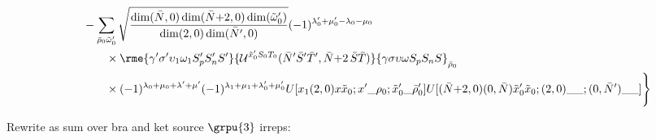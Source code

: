\documentclass[%
  aps,%
  prc,%
  showpacs,%
  superscriptaddress,%
  onecolumn,%
  notitlepage,%
  11pt,%
  floatfix,%
  amsmath,%
  amssymb,%
]{revtex4-2}
\newcommand{\plus}{\text{+}}
\begin{document}
\begin{align*}
  &\qquad-\sum_{\bar{\rho}_0\tilde{\omega}_0'}
  \sqrt{\frac{\dim(\bar{N},0)\dim(\bar{N}\plus2,0)\dim(\tilde{\omega}_0')}{\dim(2,0)\dim(\bar{N}',0)}}
  (-1)^{\lambda_0'+\mu_0'-\lambda_0-\mu_0}
  \\
  & \qquad \qquad \times
  \rme{\gamma'\sigma'\upsilon_1\omega_1S_p'S_n'S'}{\mathcal{U}^{\tilde{x}_0' S_0 T_0}(\bar{N}'\bar{S}'\bar{T}',\bar{N}\plus2\,\bar{S}\bar{T})}{\gamma \sigma \upsilon \omega S_p S_n S}_{\bar{\rho}_0}\\
  &\qquad\qquad\times
      (-1)^{\lambda_0+\mu_0+\lambda'+\mu'}(-1)^{\lambda_1+\mu_1+\lambda_0'+\mu_0'} U[x_1 (2,0) x \tilde{x}_0; x'\_\rho_0;\tilde{x}_0'\_\bar{\rho}_0']
      U[(\bar{N}\plus2,0)(0,\bar{N}) \tilde{x}_0' \tilde{x}_0;(2,0)\_\_;(0,\bar{N}')\_\_]
  \Bigg\}
\end{align*}

\clearpage

Rewrite as sum over bra and ket source $\grpu{3}$ irreps:
\end{document}
